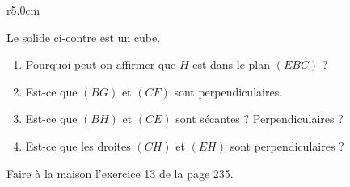 
\begin{exercice}\label{exoSeconde-0087}

\begin{wrapfigure}{r}{5.0cm}
    \vspace{-1cm}
    \centering
    
\end{wrapfigure}

            Le solide ci-contre est un cube. 
        \begin{enumerate}
            \item
                Pourquoi peut-on affirmer que \( H\) est dans le plan \( (EBC)\) ?
            \item
                Est-ce que \( (BG)\) et \( (CF)\) sont perpendiculaires.
    \item
                Est-ce que \( (BH)\) et \( (CE)\) sont sécantes ? Perpendiculaires ?
    \item
        Est-ce que les droites \( (CH)\) et \( (EH)\) sont perpendiculaires ?
        \end{enumerate}

        Faire à la maison l'exercice 13 de la page 235.

\end{exercice}
